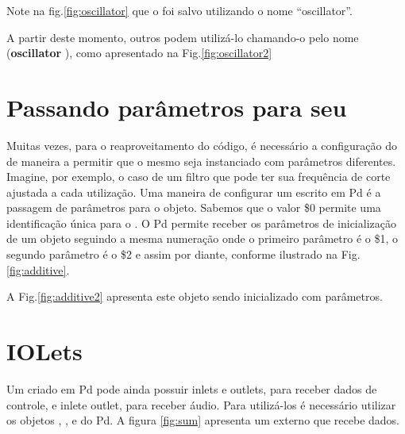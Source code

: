 
Note na fig.\ref{fig:oscillator} que o \external foi salvo utilizando o nome
``oscillator''.


A partir deste momento, outros \patches podem utilizá-lo chamando-o pelo nome
(\textbf{oscillator} ), como apresentado na Fig.\ref{fig:oscillator2}

\section{Passando parâmetros para seu \external}

Muitas vezes, para o reaproveitamento do código, é necessário a configuração do
\external de maneira a permitir que o mesmo seja instanciado com parâmetros
diferentes.
Imagine, por exemplo, o caso de um filtro que pode ter sua frequência de corte
ajustada a cada utilização.
Uma maneira de configurar um \external escrito em Pd é a passagem de parâmetros
para o objeto.
Sabemos que o valor \$0 permite uma identificação única para o \patch.
O Pd permite receber os parâmetros de inicialização de um objeto seguindo a
mesma numeração onde o primeiro parâmetro é o \$1, o
segundo parâmetro é o \$2 e assim por diante, conforme ilustrado na
Fig.\ref{fig:additive}.


A Fig.\ref{fig:additive2} apresenta este objeto sendo inicializado com
parâmetros.


\section{IOLets}

Um \external criado em Pd pode ainda possuir inlets e outlets, para receber
dados de controle, e inlet\til  e outlet\til, para receber áudio.
Para utilizá-los é necessário utilizar os objetos , ,
 e  do Pd.
A figura \ref{fig:sum} apresenta um externo que recebe dados.

